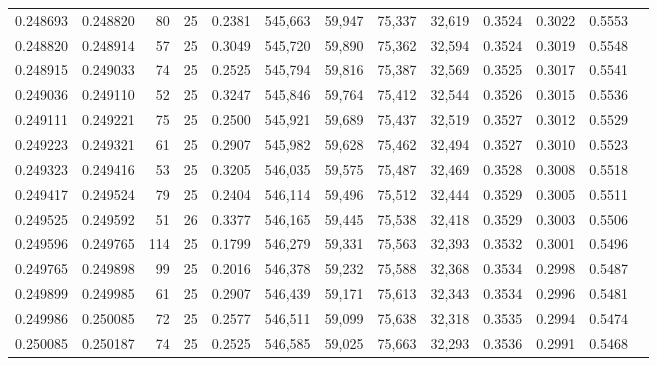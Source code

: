 \begin{tabular}{rrrrrrrrrrrrr}
0.248693 & 0.248820 &    80 &  25 &                                     0.2381 & 545,663 &  59,947 &  75,337 &  32,619 & 0.3524 & 0.3022 & 0.5553 \\
0.248820 & 0.248914 &    57 &  25 &                                     0.3049 & 545,720 &  59,890 &  75,362 &  32,594 & 0.3524 & 0.3019 & 0.5548 \\
0.248915 & 0.249033 &    74 &  25 &                                     0.2525 & 545,794 &  59,816 &  75,387 &  32,569 & 0.3525 & 0.3017 & 0.5541 \\
0.249036 & 0.249110 &    52 &  25 &                                     0.3247 & 545,846 &  59,764 &  75,412 &  32,544 & 0.3526 & 0.3015 & 0.5536 \\
0.249111 & 0.249221 &    75 &  25 &                                     0.2500 & 545,921 &  59,689 &  75,437 &  32,519 & 0.3527 & 0.3012 & 0.5529 \\
0.249223 & 0.249321 &    61 &  25 &                                     0.2907 & 545,982 &  59,628 &  75,462 &  32,494 & 0.3527 & 0.3010 & 0.5523 \\
0.249323 & 0.249416 &    53 &  25 &                                     0.3205 & 546,035 &  59,575 &  75,487 &  32,469 & 0.3528 & 0.3008 & 0.5518 \\
0.249417 & 0.249524 &    79 &  25 &                                     0.2404 & 546,114 &  59,496 &  75,512 &  32,444 & 0.3529 & 0.3005 & 0.5511 \\
0.249525 & 0.249592 &    51 &  26 &                                     0.3377 & 546,165 &  59,445 &  75,538 &  32,418 & 0.3529 & 0.3003 & 0.5506 \\
0.249596 & 0.249765 &   114 &  25 &                                     0.1799 & 546,279 &  59,331 &  75,563 &  32,393 & 0.3532 & 0.3001 & 0.5496 \\
0.249765 & 0.249898 &    99 &  25 &                                     0.2016 & 546,378 &  59,232 &  75,588 &  32,368 & 0.3534 & 0.2998 & 0.5487 \\
0.249899 & 0.249985 &    61 &  25 &                                     0.2907 & 546,439 &  59,171 &  75,613 &  32,343 & 0.3534 & 0.2996 & 0.5481 \\
0.249986 & 0.250085 &    72 &  25 &                                     0.2577 & 546,511 &  59,099 &  75,638 &  32,318 & 0.3535 & 0.2994 & 0.5474 \\
0.250085 & 0.250187 &    74 &  25 &                                     0.2525 & 546,585 &  59,025 &  75,663 &  32,293 & 0.3536 & 0.2991 & 0.5468 \\

\end{tabular}
